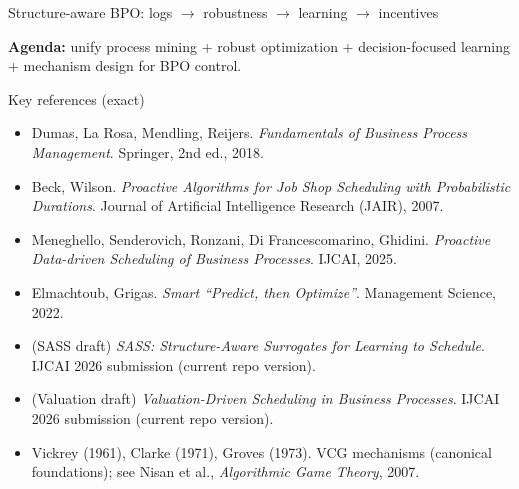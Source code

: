 \documentclass[aspectratio=169,10pt]{beamer}
\newif\iflong
\newcommand{\btext}[1]{\textbf{\color{darkred}#1}}
\begin{document}
\begin{frame}{Structure-aware BPO: logs \(\rightarrow\) robustness \(\rightarrow\) learning \(\rightarrow\) incentives}
  \begin{center}
  \end{center}
  \vspace{0.15cm}
  \btext{Agenda:} unify process mining + robust optimization + decision-focused learning + mechanism design for BPO control.
\end{frame}

\begin{frame}{Key references (exact)}
  \scriptsize
  \begin{itemize}
    \item Dumas, La Rosa, Mendling, Reijers. \emph{Fundamentals of Business Process Management}. Springer, 2nd ed., 2018.
    \item Beck, Wilson. \emph{Proactive Algorithms for Job Shop Scheduling with Probabilistic Durations}. Journal of Artificial Intelligence Research (JAIR), 2007.
    \item Meneghello, Senderovich, Ronzani, Di Francescomarino, Ghidini. \emph{Proactive Data-driven Scheduling of Business Processes}. IJCAI, 2025.
    \item Elmachtoub, Grigas. \emph{Smart ``Predict, then Optimize''}. Management Science, 2022.
    \item (SASS draft) \emph{SASS: Structure-Aware Surrogates for Learning to Schedule}. IJCAI 2026 submission (current repo version).
    \item (Valuation draft) \emph{Valuation-Driven Scheduling in Business Processes}. IJCAI 2026 submission (current repo version).
    \item Vickrey (1961), Clarke (1971), Groves (1973). VCG mechanisms (canonical foundations); see Nisan et al., \emph{Algorithmic Game Theory}, 2007.
  \end{itemize}
\end{frame}
\end{document}
